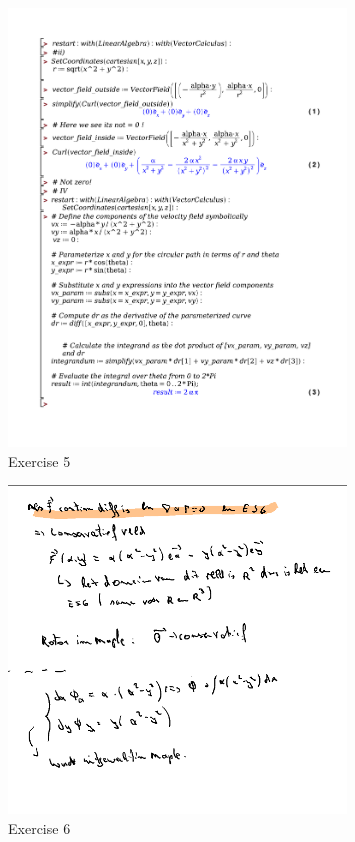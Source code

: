 \documentclass[a4paper]{article}
\begin{document}
\begin{figure}[H]
	\centering
	\includegraphics[width=0.8\textwidth]{exercises/huis_6_ex_5.pdf}
	\caption{Exercise 5}
	\label{fig:huis_6_ex_5_maple}
\end{figure}


\begin{figure}[H]
	\centering
	\includegraphics[width=0.8\textwidth]{assets/huis_6_ex_6.png}
	\caption{Exercise 6}
	\label{fig:huis_6_ex_6}
\end{figure}
\end{document}
